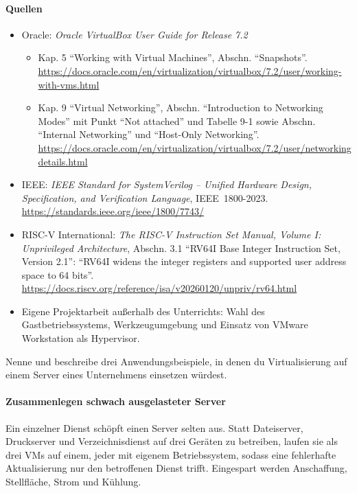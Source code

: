 \paragraph{Quellen}
\begin{itemize}[quellen]
  \item Oracle: \emph{Oracle VirtualBox User Guide for Release 7.2}
  \begin{itemize}[nosep]
    \item Kap. 5 \enquote{Working with Virtual Machines}, Abschn. \enquote{Snapshots}. \url{https://docs.oracle.com/en/virtualization/virtualbox/7.2/user/working-with-vms.html}
    \item Kap. 9 \enquote{Virtual Networking}, Abschn. \enquote{Introduction to Networking Modes} mit Punkt \enquote{Not attached} und Tabelle 9-1 sowie Abschn. \enquote{Internal Networking} und \enquote{Host-Only Networking}. \url{https://docs.oracle.com/en/virtualization/virtualbox/7.2/user/networkingdetails.html}
  \end{itemize}
  \item IEEE: \emph{IEEE Standard for SystemVerilog -- Unified Hardware Design, Specification, and Verification Language}, IEEE~1800-2023. \url{https://standards.ieee.org/ieee/1800/7743/}
  \item RISC-V International: \emph{The RISC-V Instruction Set Manual, Volume I: Unprivileged Architecture}, Abschn. 3.1 \enquote{RV64I Base Integer Instruction Set, Version 2.1}: \enquote{RV64I widens the integer registers and supported user address space to 64 bits}. \url{https://docs.riscv.org/reference/isa/v20260120/unpriv/rv64.html}
  \item Eigene Projektarbeit außerhalb des Unterrichts: Wahl des Gastbetriebssystems, Werkzeugumgebung und Einsatz von VMware Workstation als Hypervisor.
\end{itemize}

\begin{aufgabe}
Nenne und beschreibe drei Anwendungsbeispiele, in denen du Virtualisierung auf einem Server eines Unternehmens einsetzen würdest.
\end{aufgabe}

\paragraph{Zusammenlegen schwach ausgelasteter Server} Ein einzelner Dienst schöpft einen Server selten aus. Statt Dateiserver, Druckserver und Verzeichnisdienst auf drei Geräten zu betreiben, laufen sie als drei VMs auf einem, jeder mit eigenem Betriebssystem, sodass eine fehlerhafte Aktualisierung nur den betroffenen Dienst trifft. Eingespart werden Anschaffung, Stellfläche, Strom und Kühlung.

